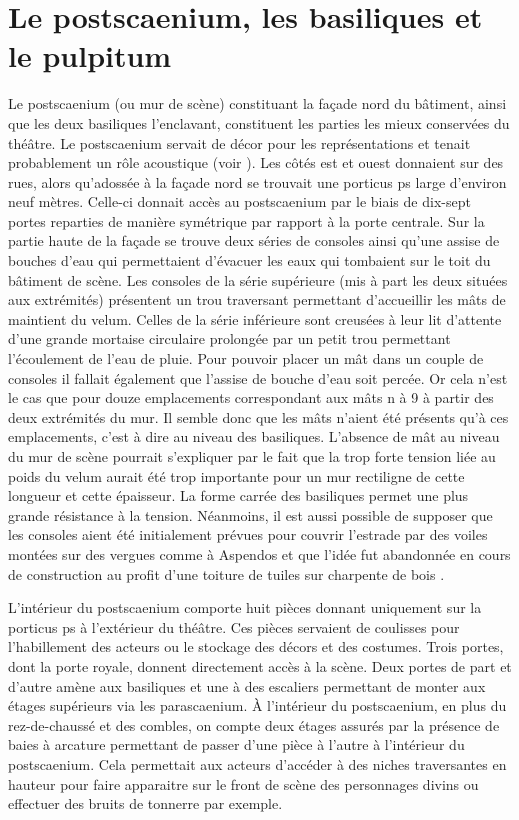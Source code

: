 \section{Le \gls{postscaenium}, les \glspl{basilique} et le \gls{pulpitum}}
\label{sect_postscaenium}
		
		Le \gls{postscaenium} (ou mur de scène) constituant la façade nord du bâtiment, ainsi que les deux \glspl{basilique} l'enclavant, constituent les parties les mieux conservées du théâtre. Le \gls{postscaenium} servait de décor pour les représentations et tenait probablement un rôle acoustique (voir ). Les côtés est et ouest donnaient sur des rues, alors qu'adossée à la façade nord se trouvait une \gls{porticus ps} large d'environ neuf mètres. Celle-ci donnait accès au \gls{postscaenium} par le biais de dix-sept portes reparties de manière symétrique par rapport à la porte centrale. Sur la partie haute de la façade se trouve deux séries de \glspl{console} ainsi qu'une assise de bouches d'eau qui permettaient d'évacuer les eaux qui tombaient sur le toit du bâtiment de scène. Les \glspl{console} de la série supérieure (mis à part les deux situées aux extrémités) présentent un trou traversant permettant d'accueillir les mâts de maintient du \gls{velum}. Celles de la série inférieure sont creusées à leur lit d'attente d'une grande mortaise circulaire prolongée par un petit trou permettant l'écoulement de l'eau de pluie. Pour pouvoir placer un mât dans un couple de \glspl{console} il fallait également que l'assise de bouche d'eau soit percée. Or cela n'est le cas que pour douze emplacements correspondant aux mâts n à 9 à partir des deux extrémités du mur. Il semble donc que les mâts n'aient été présents qu'à ces emplacements, c'est à dire au niveau des \glspl{basilique}. L'absence de mât au niveau du mur de scène pourrait s'expliquer par le fait que la trop forte tension liée au poids du \gls{velum} aurait été trop importante pour un mur rectiligne de cette longueur et cette épaisseur. La forme carrée des basiliques permet une plus grande résistance à la tension. Néanmoins, il est aussi possible de supposer que les \glspl{console} aient été initialement prévues pour couvrir l'estrade par des voiles montées sur des vergues comme à Aspendos et que l'idée fut abandonnée en cours de construction au profit d'une toiture de tuiles sur charpente de bois \cite{moretti}. 
		
		L'intérieur du \gls{postscaenium} comporte huit pièces donnant uniquement sur la \gls{porticus ps} à l'extérieur du théâtre. Ces pièces servaient de coulisses pour l'habillement des acteurs ou le stockage des décors et des costumes. Trois portes, dont la porte royale, donnent directement accès à la scène. Deux portes de part et d'autre amène aux \glspl{basilique} et une à des escaliers permettant de monter aux étages supérieurs via les \gls{parascaenium}. \`{A} l'intérieur du \gls{postscaenium}, en plus du rez-de-chaussé et des combles, on compte deux étages assurés par la présence de baies à arcature permettant de passer d'une pièce à l'autre à l'intérieur du \gls{postscaenium}. Cela permettait aux acteurs d'accéder à des niches traversantes en hauteur pour faire apparaitre sur le front de scène des personnages divins ou effectuer des bruits de tonnerre par exemple.
		
